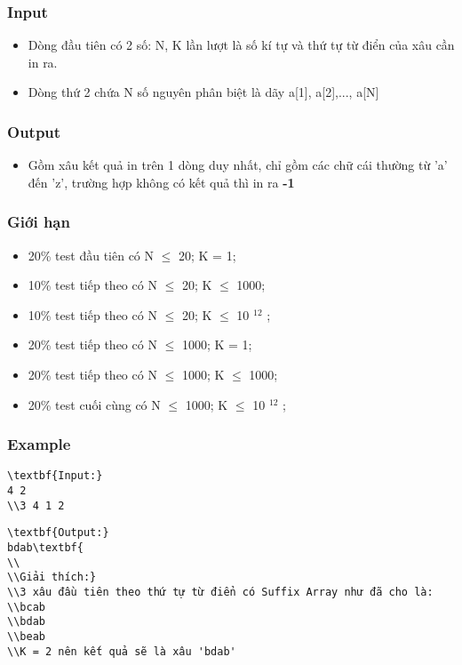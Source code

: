 \subsubsection{   Input  }
\begin{itemize}
	\item     Dòng đầu tiên có 2 số: N, K lần lượt là số kí tự và thứ tự từ điển của xâu cần in ra.   
	\item     Dòng thứ 2 chứa N số nguyên phân biệt là dãy a[1], a[2],..., a[N]   
\end{itemize}

\subsubsection{   Output  }
\begin{itemize}
	\item     Gồm xâu kết quả in trên 1 dòng duy nhất, chỉ gồm các chữ cái thường từ 'a' đến 'z', trường hợp không có kết quả thì in ra    \textbf{     -1    }
\end{itemize}

\subsubsection{   Giới hạn  }
\begin{itemize}
	\item     20\% test đầu tiên có N  $\le$  20; K = 1;   
	\item     10\% test tiếp theo có N  $\le$  20; K  $\le$  1000;   
	\item     10\% test tiếp theo có N  $\le$  20; K  $\le$  10    $^     12    $    ;   
	\item     20\% test tiếp theo có N  $\le$  1000; K = 1;   
	\item     20\% test tiếp theo có N  $\le$  1000; K  $\le$ 1000;   
	\item     20\% test cuối cùng có N  $\le$  1000; K  $\le$  10    $^     12    $    ;   
\end{itemize}

\subsubsection{   Example  }
\begin{verbatim}
\textbf{Input:}
4 2
\\3 4 1 2\end{verbatim}
\begin{verbatim}
\textbf{Output:}
bdab\textbf{
\\
\\Giải thích:}
\\3 xâu đầu tiên theo thứ tự từ điển có Suffix Array như đã cho là:
\\bcab
\\bdab
\\beab
\\K = 2 nên kết quả sẽ là xâu 'bdab' \end{verbatim}
